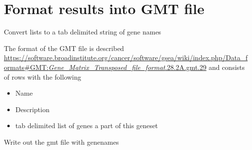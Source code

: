 \documentclass[
]{book}
\newenvironment{Shaded}{\begin{snugshade}}{\end{snugshade}}
\newcommand{\AttributeTok}[1]{\textcolor[rgb]{0.13,0.29,0.53}{#1}}
\newcommand{\ControlFlowTok}[1]{\textcolor[rgb]{0.13,0.29,0.53}{\textbf{#1}}}
\newcommand{\FunctionTok}[1]{\textcolor[rgb]{0.13,0.29,0.53}{\textbf{#1}}}
\newcommand{\NormalTok}[1]{#1}
\newcommand{\OtherTok}[1]{\textcolor[rgb]{0.56,0.35,0.01}{#1}}
\newcommand{\SpecialCharTok}[1]{\textcolor[rgb]{0.81,0.36,0.00}{\textbf{#1}}}
\newcommand{\StringTok}[1]{\textcolor[rgb]{0.31,0.60,0.02}{#1}}
\providecommand{\tightlist}{%
  \setlength{\itemsep}{0pt}\setlength{\parskip}{0pt}}
\begin{document}
\section{Format results into GMT file}\label{format-results-into-gmt-file-1}

Convert lists to a tab delimited string of gene names

\begin{Shaded}
\end{Shaded}

The format of the GMT file is described \href{here}{https://software.broadinstitute.org/cancer/software/gsea/wiki/index.php/Data\_formats\#GMT:\emph{Gene\_Matrix\_Transposed\_file\_format}.28.2A.gmt.29} and consists of rows with the following

\begin{itemize}
\tightlist
\item
  Name
\item
  Description
\item
  tab delimited list of genes a part of this geneset
\end{itemize}

Write out the gmt file with genenames
\end{document}
